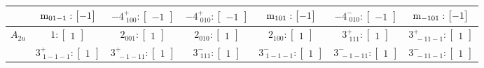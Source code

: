 \documentclass[fleqn,8pt,landscape]{jsarticle}
\begin{document}
\begin{longtable}{ccccccc}
& $ {\rm m}_{01-1}:\begin{bmatrix} -1 \end{bmatrix} $ & $ -4^{+}_{\,\,100}:\begin{bmatrix} -1 \end{bmatrix} $ & $ -4^{+}_{\,\,010}:\begin{bmatrix} -1 \end{bmatrix} $ & $ {\rm m}_{101}:\begin{bmatrix} -1 \end{bmatrix} $ & $ -4^{-}_{\,\,010}:\begin{bmatrix} -1 \end{bmatrix} $ & $ {\rm m}_{-101}:\begin{bmatrix} -1 \end{bmatrix} $ \\ \hline
$ A_{2u} $ & $ 1:\begin{bmatrix} 1 \end{bmatrix} $ & $ 2{}_{001}:\begin{bmatrix} 1 \end{bmatrix} $ & $ 2{}_{010}:\begin{bmatrix} 1 \end{bmatrix} $ & $ 2{}_{100}:\begin{bmatrix} 1 \end{bmatrix} $ & $ 3^{+}_{\,\,111}:\begin{bmatrix} 1 \end{bmatrix} $ & $ 3^{+}_{\,\,-11-1}:\begin{bmatrix} 1 \end{bmatrix} $ \\
& $ 3^{+}_{\,\,1-1-1}:\begin{bmatrix} 1 \end{bmatrix} $ & $ 3^{+}_{\,\,-1-11}:\begin{bmatrix} 1 \end{bmatrix} $ & $ 3^{-}_{\,\,111}:\begin{bmatrix} 1 \end{bmatrix} $ & $ 3^{-}_{\,\,1-1-1}:\begin{bmatrix} 1 \end{bmatrix} $ & $ 3^{-}_{\,\,-1-11}:\begin{bmatrix} 1 \end{bmatrix} $ & $ 3^{-}_{\,\,-11-1}:\begin{bmatrix} 1 \end{bmatrix} $ \\

\end{longtable}
\end{document}
